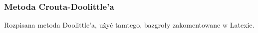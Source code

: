 \documentclass{article}
\begin{document}
\subsubsection{Metoda Crouta-Doolittle'a}
Rozpisana metoda Doolittle'a, użyć tamtego, bazgroły zakomentowane w Latexie.
\end{document}
